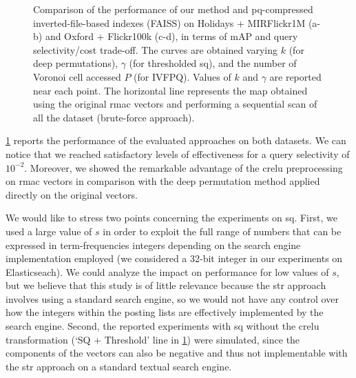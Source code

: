\begin{figure}
\caption{Comparison of the performance of our method and \gls{pq}-compressed inverted-file-based indexes (FAISS) on Holidays + MIRFlickr1M (a-b) and Oxford + Flickr100k (c-d), in terms of mAP and query selectivity/cost trade-off.
The curves are obtained varying $k$ (for deep permutations), $\gamma$ (for thresholded \gls{sq}), and the number of Voronoi cell accessed $P$ (for IVFPQ).
Values of $k$ and $\gamma$ are reported near each point.
The horizontal line represents the \gls{map} obtained using the original \gls{rmac} vectors and performing a sequential scan of all the dataset (brute-force approach).
}
\label{fig:str:results}
\end{figure}

\ref{fig:str:results} reports the performance of the evaluated approaches on both datasets.
We can notice that we reached satisfactory levels of effectiveness for a query selectivity of $10^{-2}$.
Moreover, we showed the remarkable advantage of the \gls{crelu} preprocessing on \gls{rmac} vectors in comparison with the deep permutation method applied directly on the original vectors.

We would like to stress two points concerning the experiments on \gls{sq}.
First, we used a large value of $s$ in order to exploit the full range of numbers that can be expressed in term-frequencies integers depending on the search engine implementation employed (we considered a 32-bit integer in our experiments on Elasticseach).
We could analyze the impact on performance for low values of $s$, but we believe that this study is of little relevance because the \gls{str} approach involves using a standard search engine, so we would not have any control over how the integers within the posting lists are effectively implemented by the search engine.
Second, the reported experiments with \gls{sq} without the \gls{crelu} transformation (`SQ + Threshold' line in \ref{fig:str:results}) were simulated, since the components of the vectors can also be negative and thus not implementable with the \gls{str} approach on a standard textual search engine.

